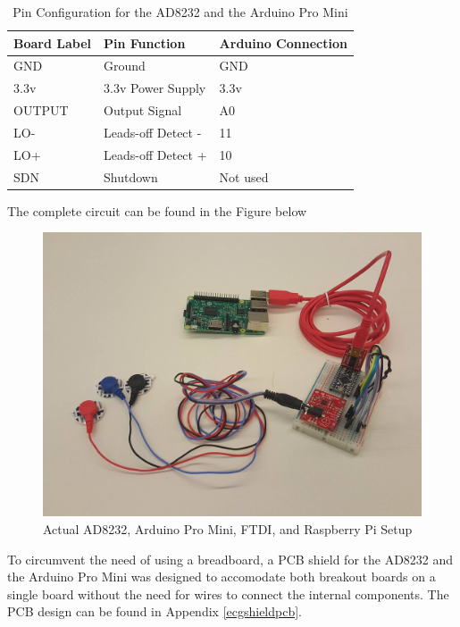 \begin{table}[H]
	\centering
	\caption{Pin Configuration for the AD8232 and the Arduino Pro Mini \cite{ad8232}}
	\label{ad8232pinconfigurationtable}
	\begin{tabular}{|l|l|l|}
		\hline
		\textbf{Board Label} & \textbf{Pin Function} & \textbf{Arduino Connection} \\ \hline
		GND                  & Ground                & GND                         \\ \hline
		3.3v                 & 3.3v Power Supply     & 3.3v                        \\ \hline
		OUTPUT               & Output Signal         & A0                          \\ \hline
		LO-                  & Leads-off Detect -    & 11                          \\ \hline
		LO+                  & Leads-off Detect +    & 10                          \\ \hline
		SDN                  & Shutdown              & Not used                    \\ \hline
	\end{tabular}
\end{table}


The complete circuit can be found in the Figure below 

\begin{figure}[H]
	\centering
	\includegraphics[width=0.6\linewidth]{ecgsetupactual.jpg}
	\caption{Actual AD8232, Arduino Pro Mini, FTDI, and Raspberry Pi Setup} %
	\label{ecgsetup}
\end{figure}

To circumvent the need of using a breadboard, a PCB shield for the AD8232 and the Arduino Pro Mini was designed to accomodate both breakout boards on a single board without the need for wires to connect the internal components. The PCB design can be found in Appendix \ref{ecgshieldpcb}. 




